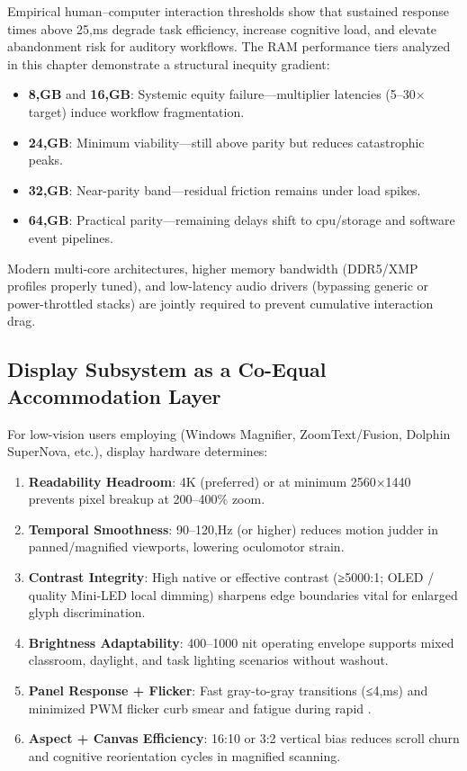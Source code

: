 Empirical human–computer interaction thresholds show that sustained response times above 25,ms degrade task efficiency, increase cognitive load, and elevate abandonment risk for auditory  workflows. The RAM performance tiers analyzed in this chapter demonstrate a structural inequity gradient:
\begin{itemize}
	\item \textbf{8,GB} and \textbf{16,GB}: Systemic equity failure—multiplier latencies (5–30$\times$ target) induce workflow fragmentation.
	\item \textbf{24,GB}: Minimum viability—still above parity but reduces catastrophic peaks.
	\item \textbf{32,GB}: Near-parity band—residual friction remains under load spikes.
	\item \textbf{64,GB}: Practical parity—remaining delays shift to \gls{cpu}/storage and software event pipelines.
\end{itemize}
Modern multi-core architectures, higher memory bandwidth (DDR5/XMP profiles properly tuned), and low-latency audio drivers (bypassing generic or power-throttled stacks) are jointly required to prevent cumulative interaction drag.

\subsection*{Display Subsystem as a Co-Equal Accommodation Layer}

For low-vision users employing  (Windows Magnifier, ZoomText/Fusion, Dolphin SuperNova, etc.), display hardware determines:
\begin{enumerate}
	\item \textbf{Readability Headroom}: 4K (preferred) or at minimum 2560×1440 prevents pixel breakup at 200–400\% zoom.
	\item \textbf{Temporal Smoothness}: 90–120,Hz (or higher) reduces motion judder in panned/magnified viewports, lowering oculomotor strain.
	\item \textbf{Contrast Integrity}: High native or effective contrast (≥5000:1; OLED / quality Mini‑LED local dimming) sharpens edge boundaries vital for enlarged glyph discrimination.
	\item \textbf{Brightness Adaptability}: 400–1000 nit operating envelope supports mixed classroom, daylight, and task lighting scenarios without washout.
	\item \textbf{Panel Response + Flicker}: Fast gray-to-gray transitions (≤4,ms) and minimized PWM flicker curb smear and fatigue during rapid .
	\item \textbf{Aspect + Canvas Efficiency}: 16:10 or 3:2 vertical bias reduces scroll churn and cognitive reorientation cycles in magnified scanning.
\end{enumerate}


